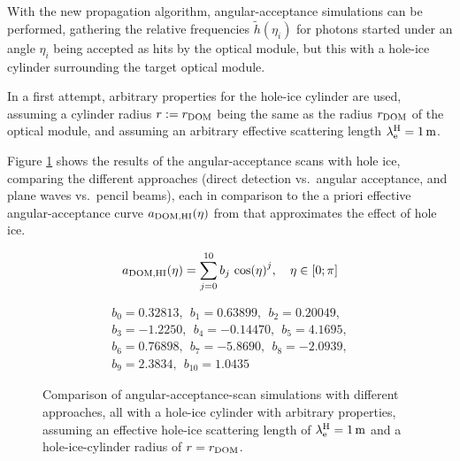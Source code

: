 \label{sec:hole_ice_approximation} With the new propagation algorithm,
angular-acceptance simulations can be performed, gathering the relative
frequencies \(\tilde{h}(\eta_i)\) for photons started under an angle
\(\eta_i\) being accepted as hits by the optical module, but this with a
hole-ice cylinder surrounding the target optical module.

In a first attempt, arbitrary properties for the hole-ice cylinder are
used, assuming a cylinder radius \(r:=r_\text{DOM}\) being the same as the
radius \(r_\text{DOM}\) of the optical module, and assuming an arbitrary
effective scattering length \(\lambda^\text{H}_\text{e} = 1\text{\,m}\).


Figure \ref{fig:eVapie9t} shows the results of the angular-acceptance
scans with hole ice, comparing the different approaches (direct
detection vs.~angular acceptance, and plane waves vs.~pencil beams),
each in comparison to the a priori effective angular-acceptance curve
\(a_\text{DOM,HI}(\eta)\) from \cite{icepaper} that approximates the effect of
hole ice.

\begin{equation}
  a_\text{DOM,HI}(\eta) = \sum_{j = 0}^{10} b_j\,\cos(\eta)^j, \ \ \ \eta \in [0; \pi]
  \label{eq:aholeice}
\end{equation}

\begin{gather*}
  b_0 = 0.32813, \ \ b_1 = 0.63899, \ \ b_2 = 0.20049, \\
  b_3 = -1.2250, \ \ b_4 = -0.14470, \ \ b_5 = 4.1695, \\
  b_6 = 0.76898, \ \ b_7 = -5.8690, \ \ b_8 = -2.0939, \\
  b_9 = 2.3834, \ \ b_{10} = 1.0435
\end{gather*}

\begin{figure}[htbp]
  \hfill
  \hfill
  \hfill
  \hfill
  \caption{Comparison of angular-acceptance-scan simulations with different approaches, all with a hole-ice cylinder with arbitrary properties, assuming an effective hole-ice scattering length of $\lambda^\text{H}_{\mathrm{e}}=1\text{\,m}$ and a hole-ice-cylinder radius of $r=r_\text{DOM}$.}
  \label{fig:eVapie9t}
\end{figure}

